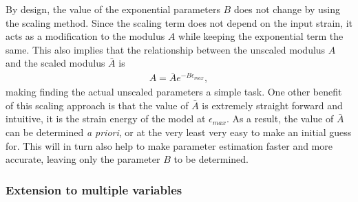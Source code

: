     By design, the value of the exponential parameters $B$ does not change by using the scaling method. Since the scaling term does not depend on the input strain, it acts as a modification to the modulus $A$ while keeping the exponential term the same. This also implies that the relationship between the unscaled modulus $A$ and the scaled modulus $\bar{A}$ is
\begin{equation}
\begin{aligned}
A = \bar{A} e^{-B\epsilon_{max}},
\end{aligned}
\end{equation}
making finding the actual unscaled parameters a simple task. One other benefit of this scaling approach is that the value of $\bar{A}$ is extremely straight forward and intuitive, it is the strain energy of the model at $\epsilon_{max}$. As a result, the value of $\bar{A}$ can be determined \textit{a priori}, or at the very least very easy to make an initial guess for. This will in turn also help to make parameter estimation faster and more accurate, leaving only the parameter $B$ to be determined. 


\subsubsection{Extension to multiple variables}

